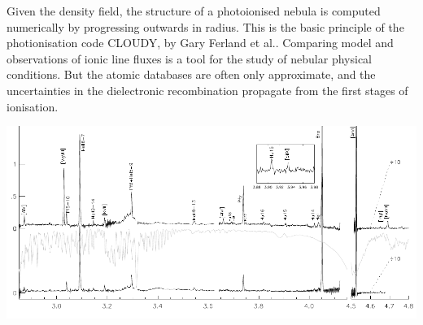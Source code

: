 
Given the density field, the structure of a photoionised nebula is
computed numerically by progressing outwards in radius. This is the
basic principle of the photionisation code {\small CLOUDY}, by Gary
Ferland et al.. Comparing model and observations of ionic line fluxes
is a tool for the study of nebular physical conditions. But the atomic
databases are often only approximate, and the uncertainties in the
dielectronic recombination propagate from the first stages of
ionisation.


\foilhead{}

\vspace{5cm}
\begin{center}
  \includegraphics[width=25cm,height=!]{./C/specCGS4.pdf}
\end{center}

